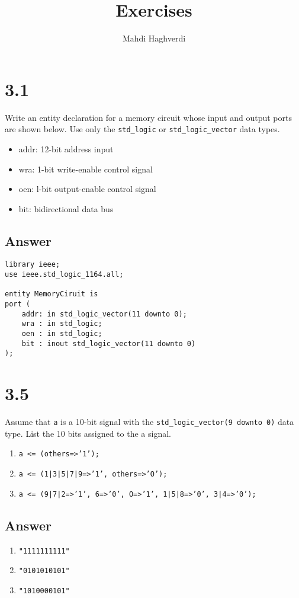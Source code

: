 \documentclass[dvipsnames, svgnames, x11names, a4paper,12pt]{article}
\title{Exercises}
\author{Mahdi Haghverdi}
\begin{document}
    \maketitle    
\section{3.1}
Write an entity declaration for a memory circuit whose input and output ports are
shown below. Use only the \texttt{std\_logic} or \texttt{std\_logic\_vector} data types.

\begin{itemize}
    \item addr: 12-bit address input
    \item  wra: 1-bit write-enable control signal
    \item oen: l-bit output-enable control signal
    \item  bit: bidirectional data bus
\end{itemize}

\subsection{Answer}
\begin{lstlisting}
library ieee;
use ieee.std_logic_1164.all;

entity MemoryCiruit is 
port (
    addr: in std_logic_vector(11 downto 0);
    wra : in std_logic;
    oen : in std_logic;
    bit : inout std_logic_vector(11 downto 0)
);
\end{lstlisting}

\section{3.5}    
Assume that \texttt{a} is a 10-bit signal with the \texttt{std\_logic\_vector(9 downto 0)} data
type. List the 10 bits assigned to the a signal.

\begin{enumerate}[label=(\alph*)]
    \item \texttt{a <= (others=>'1');}
    \item \texttt{a <= (1|3|5|7|9=>'1', others=>'O');}
    \item \texttt{a <= (9|7|2=>'1', 6=>'0', O=>'1', 1|5|8=>'0', 3|4=>'0');}
\end{enumerate}
\subsection{Answer}
\begin{enumerate}[label=(\alph*)]
    \item \texttt{"1111111111"}
    \item \texttt{"0101010101"}
    \item \texttt{"1010000101"}
\end{enumerate}
\end{document}
